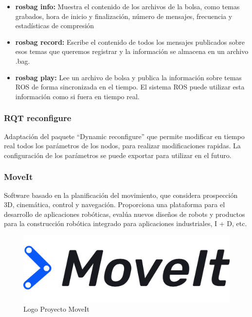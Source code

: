                     \begin{itemize}
                        \item{\textbf{rosbag info:} Muestra el contenido de los archivos de la bolsa, como temas grabados, hora de inicio y finalización, número de mensajes, frecuencia y estadísticas de compresión} 
                        \item{\textbf{rosbag record:} Escribe el contenido de todos los mensajes publicados sobre esos temas que queremos registrar y la información se almacena en un archivo .bag.} 
                        \item{\textbf{rosbag play: } Lee un archivo de bolsa y publica la información sobre temas ROS de forma sincronizada en el tiempo. El sistema ROS puede utilizar esta información como si fuera en tiempo real.} 
                    \end{itemize}

            \subsubsection{RQT reconfigure}
Adaptación del paquete “Dynamic reconfigure” que permite modificar en tiempo real todos los parámetros de los nodos, para realizar modificaciones rapidas. La configuración de los parámetros se puede exportar para utilizar en el futuro.

            \subsubsection{MoveIt }
 Software basado en la planificación del movimiento, que considera prospección 3D, cinemática, control y navegación. Proporciona una plataforma para el desarrollo de aplicaciones robóticas, evalúa nuevos diseños de robots y productos para la construcción robótica integrado para aplicaciones industriales, I + D, etc.
 
             \begin{figure}[htb]
                \centering
                \includegraphics[width=0.8\linewidth]{Main/Chapter3/Images3/herramientas_2.png}
                \caption{Logo Proyecto MoveIt}
                \label{f:Cap3_herramientas_2}
            \end{figure}     
            
